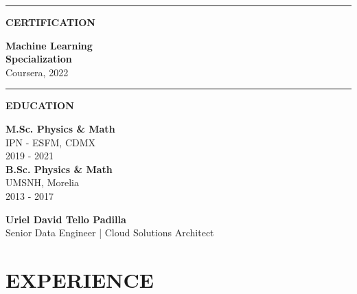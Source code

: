 \documentclass[a4paper,10pt]{article}
\begin{document}
\begin{minipage}[t]{6.2cm}
\begin{minipage}[t]{5.5cm}
\vspace{0.2cm}
{\color{lightgreen!60}\rule{4.8cm}{0.4pt}}
\vspace{0.2cm}

{\large\bfseries CERTIFICATION}\\[0.3cm]
\begin{flushleft}
\small
\textbf{Machine Learning}\\
\textbf{Specialization}\\
Coursera, 2022
\end{flushleft}

\vspace{0.2cm}
{\color{lightgreen!60}\rule{4.8cm}{0.4pt}}
\vspace{0.2cm}

{\large\bfseries EDUCATION}\\[0.3cm]
\begin{flushleft}
\small
\textbf{M.Sc. Physics \& Math}\\
IPN - ESFM, CDMX\\
2019 - 2021\\[0.25cm]

\textbf{B.Sc. Physics \& Math}\\
UMSNH, Morelia\\
2013 - 2017
\end{flushleft}

\end{minipage}
\end{minipage}%
\hfill%
\begin{minipage}[t]{14.3cm}
\vspace*{0.5cm}
\hspace{0.4cm}
\begin{minipage}[t]{13.4cm}
\color{textgray}

{\fontsize{26}{30}\selectfont\bfseries\color{darkgreen} Uriel David Tello Padilla}\\[0.15cm]
{\large\color{accentgreen} Senior Data Engineer | Cloud Solutions Architect}

\vspace{0.4cm}

\section{EXPERIENCE}


\vspace{0.3cm}


\end{minipage}
\end{minipage}
\end{document}
